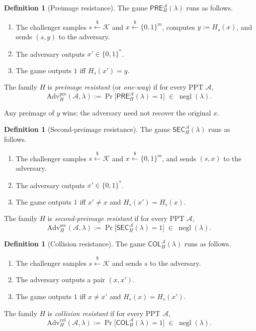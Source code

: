 \documentclass[11pt,a4paper]{article}
\theoremstyle{definition}
\newtheorem{definition}[theorem]{Definition}
\theoremstyle{remark}
\DeclareMathOperator{\negl}{negl}
\begin{document}
\begin{definition}[Preimage resistance]\label{hash:def:pre}
The game \(\mathsf{PRE}^{\mathcal{A}}_{H}(\lambda)\) runs as follows.
\begin{enumerate}
\item The challenger samples \(s \xleftarrow{\$} \mathcal{K}\) and
  \(x \xleftarrow{\$} \{0,1\}^{m}\), computes \(y := H_{s}(x)\), and
  sends \((s, y)\) to the adversary.
\item The adversary outputs \(x' \in \{0,1\}^{*}\).
\item The game outputs \(1\) iff \(H_{s}(x') = y\).
\end{enumerate}
The family \(H\) is \emph{preimage resistant} (or \emph{one-way}) if
for every PPT \(\mathcal{A}\),
\[
\mathrm{Adv}^{\mathrm{pre}}_{H}(\mathcal{A}, \lambda)
:= \Pr\bigl[\mathsf{PRE}^{\mathcal{A}}_{H}(\lambda) = 1\bigr]
\;\in\; \negl(\lambda).
\]
\end{definition}

Any preimage of \(y\) wins; the adversary need not recover the
original \(x\).

\begin{definition}[Second-preimage resistance]\label{hash:def:sec}
The game \(\mathsf{SEC}^{\mathcal{A}}_{H}(\lambda)\) runs as follows.
\begin{enumerate}
\item The challenger samples \(s \xleftarrow{\$} \mathcal{K}\) and
  \(x \xleftarrow{\$} \{0,1\}^{m}\), and sends \((s, x)\) to the
  adversary.
\item The adversary outputs \(x' \in \{0,1\}^{*}\).
\item The game outputs \(1\) iff \(x' \neq x\) and
  \(H_{s}(x') = H_{s}(x)\).
\end{enumerate}
The family \(H\) is \emph{second-preimage resistant} if for every PPT
\(\mathcal{A}\),
\[
\mathrm{Adv}^{\mathrm{sec}}_{H}(\mathcal{A}, \lambda)
:= \Pr\bigl[\mathsf{SEC}^{\mathcal{A}}_{H}(\lambda) = 1\bigr]
\;\in\; \negl(\lambda).
\]
\end{definition}

\begin{definition}[Collision resistance]\label{hash:def:col}
The game \(\mathsf{COL}^{\mathcal{A}}_{H}(\lambda)\) runs as follows.
\begin{enumerate}
\item The challenger samples \(s \xleftarrow{\$} \mathcal{K}\) and
  sends \(s\) to the adversary.
\item The adversary outputs a pair \((x, x')\).
\item The game outputs \(1\) iff \(x \neq x'\) and
  \(H_{s}(x) = H_{s}(x')\).
\end{enumerate}
The family \(H\) is \emph{collision resistant} if for every PPT
\(\mathcal{A}\),
\[
\mathrm{Adv}^{\mathrm{col}}_{H}(\mathcal{A}, \lambda)
:= \Pr\bigl[\mathsf{COL}^{\mathcal{A}}_{H}(\lambda) = 1\bigr]
\;\in\; \negl(\lambda).
\]
\end{definition}
\end{document}
